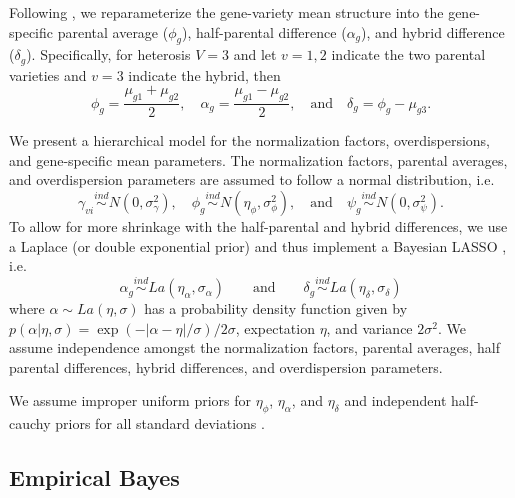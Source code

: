 \documentclass[useAMS,usenatbib,referee]{biom}
\begin{document}
Following \cite{ji2014estimation}, we reparameterize the gene-variety mean structure into the gene-specific parental average ($\phi_g$), half-parental difference ($\alpha_g$), and hybrid difference ($\delta_g$). Specifically, for heterosis $V=3$ and let $v=1,2$ indicate the two parental varieties and $v=3$ indicate the hybrid, then
\[ \phi_g = \frac{\mu_{g1}+\mu_{g2}}{2}, \quad 
\alpha_g = \frac{\mu_{g1}-\mu_{g2}}{2}, \quad \mbox{and} \quad
\delta_g = \phi_g-\mu_{g3}. \]

We present a hierarchical model for the normalization factors, overdispersions, and gene-specific mean parameters. The normalization factors, parental averages, and overdispersion parameters are assumed to follow a normal distribution, i.e.
\[ 
\gamma_{vi} \stackrel{ind}{\sim} N(0,\sigma_\gamma^2), \quad 
\phi_g \stackrel{ind}{\sim} N(\eta_\phi, \sigma_\phi^2), \quad \mbox{and}\quad 
\psi_g \stackrel{ind}{\sim} N(0,\sigma_\psi^2). 
\]
To allow for more shrinkage with the half-parental and hybrid differences, we use a Laplace (or double exponential prior) and thus implement a Bayesian LASSO \citep{park2008bayesian}, i.e. 
\[ 
\alpha_g \stackrel{ind}{\sim} La(\eta_\alpha, \sigma_\alpha) \qquad \mbox{and} \qquad
\delta_g \stackrel{ind}{\sim} La(\eta_\delta, \sigma_\delta) 
\]
where $\alpha\sim La(\eta,\sigma)$ has a probability density function given by $p(\alpha|\eta,\sigma) = \exp(-|\alpha-\eta|/\sigma)/2\sigma$, expectation $\eta$, and variance $2\sigma^2$. We assume independence amongst the normalization factors, parental averages, half parental differences, hybrid differences, and overdispersion parameters.

We assume improper uniform priors for $\eta_\phi$, $\eta_\alpha$, and $\eta_\delta$ and independent half-cauchy priors for all standard deviations \citep{gelman2006prior}.

\subsection{Empirical Bayes}
\label{s:ebayes}
\end{document}

